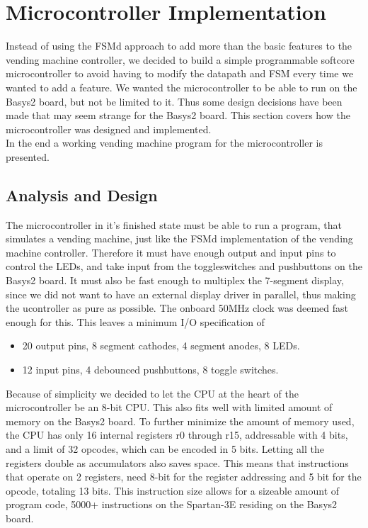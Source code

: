 \section{Microcontroller Implementation}
Instead of using the FSMd approach to add more than the basic features to the vending machine controller,
we decided to build a simple programmable softcore microcontroller to avoid having to modify the datapath
and FSM every time we wanted to add a feature. We wanted the microcontroller to be able to run
on the Basys2 board, but not be limited to it. Thus some design decisions have been made that
may seem strange for the Basys2 board.
This section covers how the microcontroller was designed
and implemented. \\

In the end a working vending machine program for the microcontroller is presented.

\subsection{Analysis and Design}
The microcontroller in it's finished state must be able to run a program, that simulates a vending machine, just like the FSMd
implementation of the vending machine controller. Therefore it must have enough output and input pins to control the
LEDs, and take input from the toggleswitches and pushbuttons on the Basys2 board. It must also be fast enough 
to multiplex the 7-segment display, since we did not want to have an external display driver in parallel, thus making
the ucontroller as pure as possible. The onboard 50MHz clock was deemed fast enough for this. This leaves a 
minimum I/O specification of
\begin{itemize}
    \item 20 output pins, 8 segment cathodes, 4 segment anodes, 8 LEDs.
    \item 12 input pins, 4 debounced pushbuttons, 8 toggle switches.
\end{itemize}
Because of simplicity we decided to let the CPU at the heart of the microcontroller be an 8-bit CPU. This also fits well with limited
amount of memory on the Basys2 board. To further minimize the amount of memory used, the CPU has only 16 internal
registers r0 through r15, addressable with 4 bits, and a limit of 32 opcodes, which can be encoded in 5 bits. Letting all the
registers double as accumulators also saves space. This means that
instructions that operate on 2 registers, need 8-bit for the register addressing and 5 bit for the opcode, totaling 13 bits. 
This instruction size allows for a sizeable amount of program code, 5000+ instructions on the Spartan-3E residing on the
Basys2 board. \\

